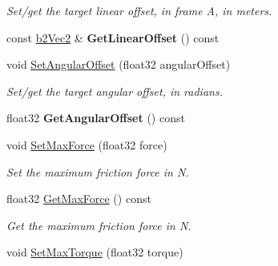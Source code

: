 \begin{DoxyCompactItemize}
\begin{DoxyCompactList}\small\item\em Set/get the target linear offset, in frame A, in meters. \end{DoxyCompactList}\item 
const \hyperlink{structb2_vec2}{b2\+Vec2} \& {\bfseries Get\+Linear\+Offset} () const \hypertarget{classb2_motor_joint_a98556efc09c020a3e53c8c57c28f2893}{}\label{classb2_motor_joint_a98556efc09c020a3e53c8c57c28f2893}

\item 
void \hyperlink{classb2_motor_joint_a14d7dca1767548ddffe293e39cafc3c7}{Set\+Angular\+Offset} (float32 angular\+Offset)\hypertarget{classb2_motor_joint_a14d7dca1767548ddffe293e39cafc3c7}{}\label{classb2_motor_joint_a14d7dca1767548ddffe293e39cafc3c7}

\begin{DoxyCompactList}\small\item\em Set/get the target angular offset, in radians. \end{DoxyCompactList}\item 
float32 {\bfseries Get\+Angular\+Offset} () const \hypertarget{classb2_motor_joint_a965a5291951461c1dc8efffde10375ef}{}\label{classb2_motor_joint_a965a5291951461c1dc8efffde10375ef}

\item 
void \hyperlink{classb2_motor_joint_a62f95f23d60123cebe14f2fcec155801}{Set\+Max\+Force} (float32 force)\hypertarget{classb2_motor_joint_a62f95f23d60123cebe14f2fcec155801}{}\label{classb2_motor_joint_a62f95f23d60123cebe14f2fcec155801}

\begin{DoxyCompactList}\small\item\em Set the maximum friction force in N. \end{DoxyCompactList}\item 
float32 \hyperlink{classb2_motor_joint_ac63233e45f6428319a9857bf89557f46}{Get\+Max\+Force} () const \hypertarget{classb2_motor_joint_ac63233e45f6428319a9857bf89557f46}{}\label{classb2_motor_joint_ac63233e45f6428319a9857bf89557f46}

\begin{DoxyCompactList}\small\item\em Get the maximum friction force in N. \end{DoxyCompactList}\item 
void \hyperlink{classb2_motor_joint_a3e9a259d36c36e0dc078282e6799d625}{Set\+Max\+Torque} (float32 torque)\hypertarget{classb2_motor_joint_a3e9a259d36c36e0dc078282e6799d625}{}\label{classb2_motor_joint_a3e9a259d36c36e0dc078282e6799d625}


\end{DoxyCompactItemize}
